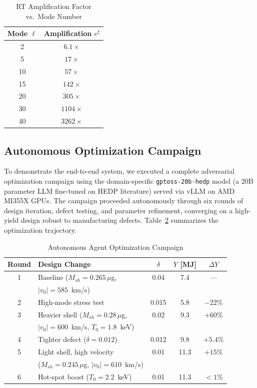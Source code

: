 \documentclass[conference]{IEEEtran}
\begin{document}
\begin{table}[htbp]
\caption{RT Amplification Factor vs.\ Mode Number}
\label{tab:rt}
\centering
\begin{tabular}{cc}
\toprule
Mode $\ell$ & Amplification $e^\xi$ \\
\midrule
2 & $6.1\times$ \\
5 & $17\times$ \\
10 & $57\times$ \\
15 & $142\times$ \\
20 & $305\times$ \\
30 & $1104\times$ \\
40 & $3262\times$ \\
\bottomrule
\end{tabular}
\end{table}

\subsection{Autonomous Optimization Campaign}

To demonstrate the end-to-end system, we executed a complete adversarial optimization campaign using the domain-specific \texttt{gptoss-20b-hedp} model (a 20B parameter LLM fine-tuned on HEDP literature) served via vLLM on AMD MI355X GPUs.  The campaign proceeded autonomously through six rounds of design iteration, defect testing, and parameter refinement, converging on a high-yield design robust to manufacturing defects.  Table~\ref{tab:campaign} summarizes the optimization trajectory.

\begin{table}[htbp]
\caption{Autonomous Agent Optimization Campaign}
\label{tab:campaign}
\centering
\begin{tabular}{clccc}
\toprule
Round & Design Change & $\delta$ & $Y$ [MJ] & $\Delta Y$ \\
\midrule
1 & Baseline ($M_{sh}\!=\!0.265\,\mu$g, & 0.04 & 7.4 & --- \\
  & $|v_0|\!=\!585$~km/s) & & & \\
2 & High-mode stress test & 0.015 & 5.8 & $-22\%$ \\
3 & Heavier shell ($M_{sh}\!=\!0.28\,\mu$g, & 0.02 & 9.3 & $+60\%$ \\
  & $|v_0|\!=\!600$~km/s, $T_0\!=\!1.8$~keV) & & & \\
4 & Tighter defect ($\delta\!=\!0.012$) & 0.012 & 9.8 & $+5.4\%$ \\
5 & Light shell, high velocity & 0.01 & 11.3 & $+15\%$ \\
  & ($M_{sh}\!=\!0.245\,\mu$g, $|v_0|\!=\!610$~km/s) & & & \\
6 & Hot-spot boost ($T_0\!=\!2.2$~keV) & 0.01 & 11.3 & $<1\%$ \\
\bottomrule
\end{tabular}
\end{table}
\end{document}

